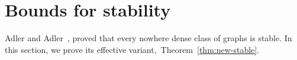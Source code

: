 
\section{Bounds for stability}\label{sec:stable}
Adler and Adler~\cite{adler2014interpreting}, 
proved that every nowhere dense class of graphs is stable. In this section,
we prove its effective variant,~Theorem~\ref{thm:new-stable}.
%

